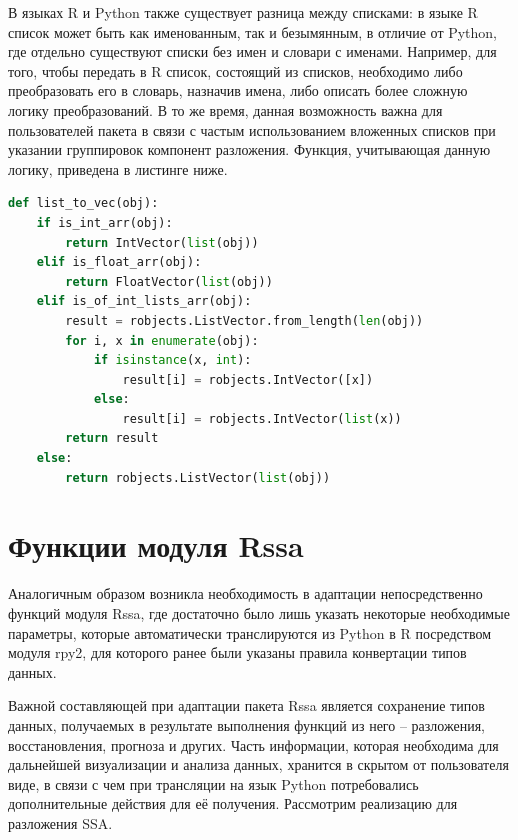 \documentclass[specialist,
			   substylefile = spbu_report.rtx,
			   subf,href,colorlinks=true, 12pt]{disser}
\begin{document}
В языках R и Python также существует разница между списками: в языке R список может быть как именованным, так и безымянным, в отличие от Python, где отдельно существуют списки без имен и словари с именами. Например, для того, чтобы передать в R список, состоящий из списков, необходимо либо преобразовать его в словарь, назначив имена, либо описать более сложную логику преобразований. В то же время, данная возможность важна для пользователей пакета в связи с частым использованием вложенных списков при указании группировок компонент разложения. Функция, учитывающая данную логику, приведена в листинге ниже.

\begin{lstlisting}[language=Python, caption=Функция для преобразования к списку в языке R.]
def list_to_vec(obj):
    if is_int_arr(obj):
        return IntVector(list(obj))
    elif is_float_arr(obj):
        return FloatVector(list(obj))
    elif is_of_int_lists_arr(obj):
        result = robjects.ListVector.from_length(len(obj))
        for i, x in enumerate(obj):
            if isinstance(x, int):
                result[i] = robjects.IntVector([x])
            else:
                result[i] = robjects.IntVector(list(x))
        return result
    else:
        return robjects.ListVector(list(obj))
\end{lstlisting}

\section{Функции модуля Rssa}

Аналогичным образом возникла необходимость в адаптации непосредственно функций модуля Rssa, где достаточно было лишь указать некоторые необходимые параметры, которые автоматически транслируются из Python в R посредством модуля rpy2, для которого ранее были указаны правила конвертации типов данных. 

Важной составляющей при адаптации пакета Rssa является сохранение типов данных, получаемых в результате выполнения функций из него – разложения, восстановления, прогноза и других. Часть информации, которая необходима для дальнейшей визуализации и анализа данных, хранится в скрытом от пользователя виде, в связи с чем при трансляции на язык Python потребовались дополнительные действия для её получения. Рассмотрим реализацию для разложения SSA.
\end{document}
